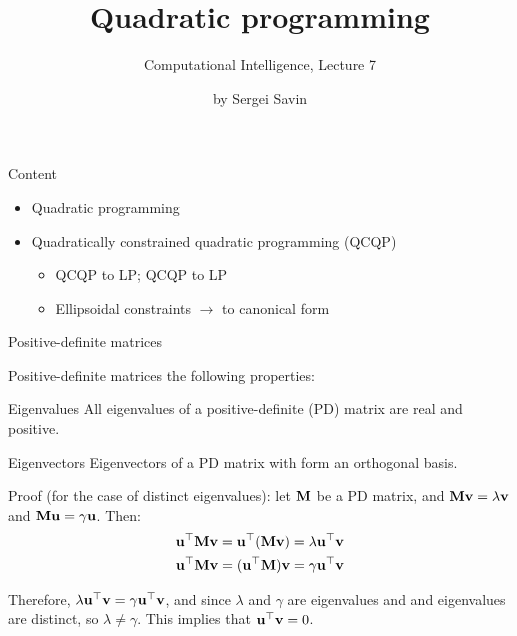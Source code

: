 \documentclass{beamer}
\title{Quadratic programming}
\subtitle{Computational Intelligence, Lecture 7}
\author{by Sergei Savin}
\date{\mydate}
\begin{document}
\maketitle


\begin{frame}{Content}

\begin{itemize}
\item  Quadratic programming
\item  Quadratically constrained quadratic programming (QCQP)
	\begin{itemize}
		\item  QCQP to LP; QCQP to LP
		\item  Ellipsoidal constraints $\rightarrow$ to canonical form
	\end{itemize}
\end{itemize}

\end{frame}




\begin{frame}{Positive-definite matrices}
	\begin{flushleft}
		
		Positive-definite matrices the following properties:
		
		\begin{block}{Eigenvalues}
			All eigenvalues of a positive-definite (PD) matrix are real and positive.
		\end{block}
	
		\begin{block}{Eigenvectors}
			Eigenvectors of a PD matrix with form an orthogonal basis.
		\end{block}
	
		Proof (for the case of distinct eigenvalues): let $\mathbf{M}$ be a PD matrix, and $\mathbf{M}\mathbf{v} = \lambda \mathbf{v}$ and  $\mathbf{M}\mathbf{u} = \gamma \mathbf{u}$. Then:
		\begin{align}
			\mathbf{u}^\top\mathbf{M}\mathbf{v} = \mathbf{u}^\top(\mathbf{M}\mathbf{v})= \lambda \mathbf{u}^\top \mathbf{v} \\
			\mathbf{u}^\top\mathbf{M}\mathbf{v} = (\mathbf{u}^\top\mathbf{M})\mathbf{v}= \gamma \mathbf{u}^\top \mathbf{v}
		\end{align}
		
		Therefore, $ \lambda \mathbf{u}^\top \mathbf{v}= \gamma \mathbf{u}^\top \mathbf{v}$, and since $\lambda$ and $ \gamma$ are eigenvalues and and eigenvalues are distinct, so $\lambda \neq \gamma$. This implies that $\mathbf{u}^\top \mathbf{v} = 0$.
		
	\end{flushleft}
\end{frame}
\end{document}
